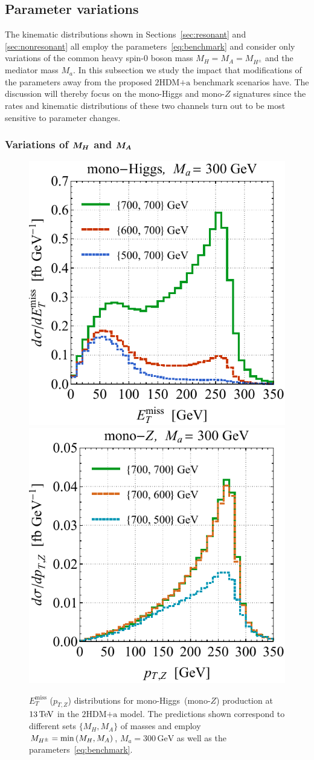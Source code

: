 \documentclass[review]{elsarticle}
\newcommand{\MET}{\ensuremath{E_T^\mathrm{miss}}\xspace}
\newcommand{\mA}{\ensuremath{M_{A}}\xspace}
\newcommand{\ma}{\ensuremath{M_{a}}\xspace}
\newcommand{\mH}{\ensuremath{M_{H}}\xspace}
\newcommand{\mHc}{\ensuremath{M_{H^{\pm}}}\xspace}
\newcommand{\hdma}{\ensuremath{\textrm{2HDM+a}}\xspace}
\def\bm#1{\mbox{\boldmath$#1$\unboldmath}}
\begin{document}
\subsection{Parameter variations}
\label{sec:parameter_variations}

The  kinematic distributions shown in Sections~\ref{sec:resonant} and \ref{sec:nonresonant}  all employ the parameters~\eqref{eq:benchmark} and consider only variations of the common heavy  spin-0 boson  mass $\mH = \mA = \mHc$ and the mediator mass $\ma$.  In this subsection we study the impact that modifications of the parameters away from the proposed \hdma benchmark scenarios have. The  discussion will thereby focus on the mono-Higgs and mono-$Z$ signatures since the rates and kinematic distributions of these two channels turn out to be  most sensitive to parameter changes. 

\subsubsection[Variations of $\mH$ and $\mA$]{Variations of $\bm{\mH}$ and $\bm{\mA}$}

\begin{figure}[t!]
\centering
\includegraphics[height=0.45\textwidth]{mvarl.pdf} \qquad 
\includegraphics[height=0.45\textwidth]{mvarr.pdf}
\vspace{2mm}
\caption{\label{fig:mvar} $\MET$ ($p_{T,Z}$) distributions for mono-Higgs~(mono-$Z$) production at $13 \, {\rm TeV}$ in the \hdma model.  The  predictions shown correspond to different sets $\{M_{H}, M_A\}$ of masses and employ $\mHc = {\rm min} \left ( \mH, \mA \right )$, $M_a = 300 \, {\mathrm{GeV}}$  as well as the parameters~\eqref{eq:benchmark}.}
\end{figure}
\end{document}
